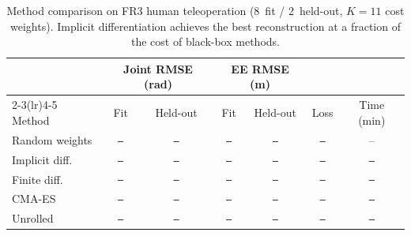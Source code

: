 \begin{table}[t]
\centering
\small
\setlength{\tabcolsep}{5pt}
\caption{Method comparison on FR3 human teleoperation (8~fit / 2~held-out, $K{=}11$ cost weights). Implicit differentiation achieves the best reconstruction at a fraction of the cost of black-box methods.}
\label{tab:e10_methods}
\begin{tabular}{lcccccc}
\toprule
& \multicolumn{2}{c}{Joint RMSE (rad)} & \multicolumn{2}{c}{EE RMSE (m)} & & \\
\cmidrule(lr){2-3}\cmidrule(lr){4-5}
Method & Fit & Held-out & Fit & Held-out & Loss & Time (min) \\
\midrule
Random weights & \texttt{--} & \texttt{--} & \texttt{--} & \texttt{--} & \texttt{--} & -- \\
Implicit diff. & \texttt{--} & \texttt{--} & \texttt{--} & \texttt{--} & \texttt{--} & \texttt{--} \\
Finite diff.   & \texttt{--} & \texttt{--} & \texttt{--} & \texttt{--} & \texttt{--} & \texttt{--} \\
CMA-ES         & \texttt{--} & \texttt{--} & \texttt{--} & \texttt{--} & \texttt{--} & \texttt{--} \\
Unrolled       & \texttt{--} & \texttt{--} & \texttt{--} & \texttt{--} & \texttt{--} & \texttt{--} \\
\bottomrule
\end{tabular}
\end{table}